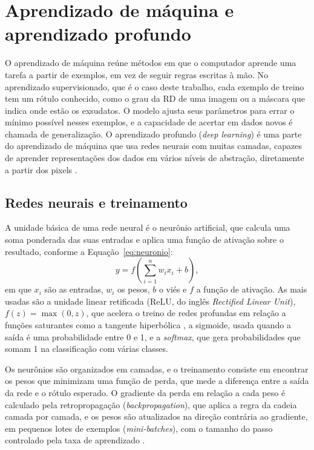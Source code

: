 \section{Aprendizado de máquina e aprendizado profundo}
\label{sec:aprendizado}

O aprendizado de máquina reúne métodos em que o computador aprende uma tarefa a partir de exemplos, em vez de seguir regras escritas à mão. No aprendizado supervisionado, que é o caso deste trabalho, cada exemplo de treino tem um rótulo conhecido, como o grau da RD de uma imagem ou a máscara que indica onde estão os exsudatos. O modelo ajusta seus parâmetros para errar o mínimo possível nesses exemplos, e a capacidade de acertar em dados novos é chamada de generalização. O aprendizado profundo (\textit{deep learning}) é uma parte do aprendizado de máquina que usa redes neurais com muitas camadas, capazes de aprender representações dos dados em vários níveis de abstração, diretamente a partir dos pixels \cite{lecun2015deep}.

\subsection{Redes neurais e treinamento}
\label{sec:redes-neurais}

A unidade básica de uma rede neural é o neurônio artificial, que calcula uma soma ponderada das suas entradas e aplica uma função de ativação sobre o resultado, conforme a Equação~\ref{eq:neuronio}:
\begin{equation}
	\label{eq:neuronio}
	y = f\left(\sum_{i=1}^{n} w_i x_i + b\right),
\end{equation}
em que $x_i$ são as entradas, $w_i$ os pesos, $b$ o viés e $f$ a função de ativação. As mais usadas são a unidade linear retificada (ReLU, do inglês \textit{Rectified Linear Unit}), $f(z) = \max(0, z)$, que acelera o treino de redes profundas em relação a funções saturantes como a tangente hiperbólica \cite{krizhevsky2017imagenet}, a sigmoide, usada quando a saída é uma probabilidade entre 0 e 1, e a \textit{softmax}, que gera probabilidades que somam 1 na classificação com várias classes.

Os neurônios são organizados em camadas, e o treinamento consiste em encontrar os pesos que minimizam uma função de perda, que mede a diferença entre a saída da rede e o rótulo esperado. O gradiente da perda em relação a cada peso é calculado pela retropropagação (\textit{backpropagation}), que aplica a regra da cadeia camada por camada, e os pesos são atualizados na direção contrária ao gradiente, em pequenos lotes de exemplos (\textit{mini-batches}), com o tamanho do passo controlado pela taxa de aprendizado \cite{lecun2015deep}.

